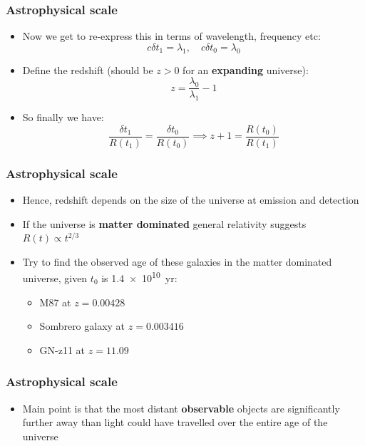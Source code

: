 \documentclass{beamer}
\begin{document}
\begin{frame}
\frametitle{Astrophysical scale}
  \begin{itemize}
    \item Now we get to re-express this in terms of wavelength, frequency etc:
      \begin{equation*}
	c\delta t_1=\lambda_1, \quad c\delta t_0=\lambda_0	
      \end{equation*}
    \item Define the redshift (should be $z>0$ for an \textbf{expanding} universe):
      \begin{equation*}
	z=\frac{\lambda_0}{\lambda_1}-1	
      \end{equation*}
    \item So finally we have:
      \begin{equation*}
	\frac{\delta t_1}{R(t_1)}=\frac{\delta t_0}{R(t_0)}\implies z+1=\frac{R(t_0)}{R(t_1)}
      \end{equation*}
  \end{itemize}
\end{frame}

\begin{frame}
  \frametitle{Astrophysical scale}
  \begin{itemize}
    \item Hence, redshift depends on the size of the universe at emission and detection
    \item If the universe is \textbf{matter dominated} general relativity suggests $R(t)\propto t^{2/3}$
    \item Try to find the observed age of these galaxies in the matter dominated universe, given $t_0$ is \SI{1.4e10}{yr}:
      \begin{itemize}
	\item M87 at $z=0.00428$
	\item Sombrero galaxy at $z=0.003416$
	\item GN-z11 at $z=11.09$
      \end{itemize}
  \end{itemize}
\end{frame}

\begin{frame}
  \frametitle{Astrophysical scale}
  \begin{itemize}
    \item Main point is that the most distant \textbf{observable} objects are significantly further away than light could have travelled over the entire age of the universe
  \end{itemize}
\end{frame}
\end{document}
